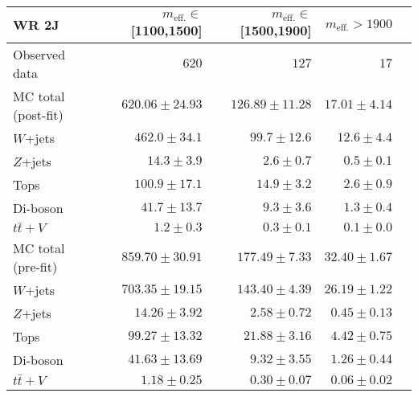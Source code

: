 \begin{table}
  \begin{center}
    \caption{ \label{tab::BGestimation::VRyields_2J}   }

    \begin{tabular*}{\textwidth}{@{\extracolsep{\fill}}lrrrr}
      \toprule
      \textbf{WR 2J} & $m_{\mathrm{eff.}}\in$[1100,1500] & $m_{\mathrm{eff.}}\in$[1500,1900] & $m_{\mathrm{eff.}}>1900$ \\
      \midrule

Observed data          & $620$              & $127$              & $17$                    \\
\midrule
\midrule
MC total (post-fit)         & $620.06 \pm 24.93$          & $126.89 \pm 11.28$          & $17.01 \pm 4.14$              \\
\midrule
        $W$+jets         & $462.0 \pm 34.1$          & $99.7 \pm 12.6$          & $12.6 \pm 4.4$              \\
        $Z$+jets         & $14.3 \pm 3.9$          & $2.6 \pm 0.7$          & $0.5 \pm 0.1$              \\
        Tops         & $100.9 \pm 17.1$          & $14.9 \pm 3.2$          & $2.6 \pm 0.9$              \\
        Di-boson         & $41.7 \pm 13.7$          & $9.3 \pm 3.6$          & $1.3 \pm 0.4$              \\
        $t\bar{t}+V$         & $1.2 \pm 0.3$          & $0.3 \pm 0.1$          & $0.1 \pm 0.0$              \\
\midrule
\midrule
MC total (pre-fit)              & $859.70 \pm 30.91$          & $177.49 \pm 7.33$          & $32.40 \pm 1.67$              \\
\midrule
        $W$+jets         & $703.35 \pm 19.15$          & $143.40 \pm 4.39$          & $26.19 \pm 1.22$              \\
        $Z$+jets         & $14.26 \pm 3.92$          & $2.58 \pm 0.72$          & $0.45 \pm 0.13$              \\
        Tops         & $99.27 \pm 13.32$          & $21.88 \pm 3.16$          & $4.42 \pm 0.75$              \\
        Di-boson         & $41.63 \pm 13.69$          & $9.32 \pm 3.55$          & $1.26 \pm 0.44$              \\
        $t\bar{t}+V$         & $1.18 \pm 0.25$          & $0.30 \pm 0.07$          & $0.06 \pm 0.02$              \\
    \bottomrule
    \end{tabular*}



\end{center}
\end{table}
